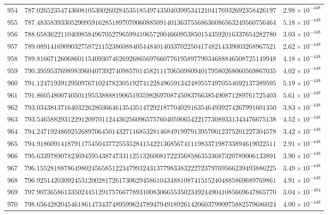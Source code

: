 \documentclass[12pt,reqno]{amsart}
\theoremstyle{remark}
\begin{document}
\begin{longtable}{clc}
$954$ & $787.0265235474360810530026028453518549743504039953412104176932692358426197$ & $2.98\times 10^{-448}$ \\
$955$ & $787.4835839330529095916285189707006088509140136375568636086563249560756464$ & $5.18\times 10^{-448}$ \\
$956$ & $788.6583622110409858496705279659941065720046609538501543592016337654282780$ & $3.03\times 10^{-448}$ \\
$957$ & $789.0891416909032758721152386088405448401403370225041748214339003268967521$ & $2.62\times 10^{-448}$ \\
$958$ & $789.8166712606860115409307462692686569766077619589779034688846508725149948$ & $4.18\times 10^{-448}$ \\
$959$ & $790.3959537698983960407392740985701458211170650980940179580268060569867035$ & $4.02\times 10^{-448}$ \\
$960$ & $791.1247193912950976710247823051927412284965913424895574970554692137389595$ & $5.19\times 10^{-448}$ \\
$961$ & $791.8605480074050119553888819065193598269708745083766385490871289761725403$ & $5.61\times 10^{-448}$ \\
$962$ & $793.0343813716403226280366461354351472921877040291635464939274267991601350$ & $3.83\times 10^{-448}$ \\
$963$ & $793.5465882931229120970112443625609657576040590654221773089331343476675138$ & $4.52\times 10^{-448}$ \\
$964$ & $794.2471924869252689706450143271168532814684919979139570012375201227304578$ & $3.42\times 10^{-448}$ \\
$965$ & $794.9186091418791175450437725535284154221368567411198337198733894619022511$ & $2.91\times 10^{-448}$ \\
$966$ & $795.6339789078236945954387473311251326008172235685863533687320789006133891$ & $3.90\times 10^{-448}$ \\
$967$ & $796.1552818878649802456585122347993243137798338322272379769566239493886225$ & $3.49\times 10^{-448}$ \\
$968$ & $796.9251420309245312002817261730629458610434881087415152404885869689769861$ & $4.91\times 10^{-448}$ \\
$969$ & $797.9073658613350244512917576677893100830665535023492449041085669647865770$ & $3.04\times 10^{-484}$ \\
$970$ & $798.6564282045461861473437489599624789479491892614206037990975882579686024$ & $4.00\times 10^{-448}$ \\

\end{longtable}
\end{document}

